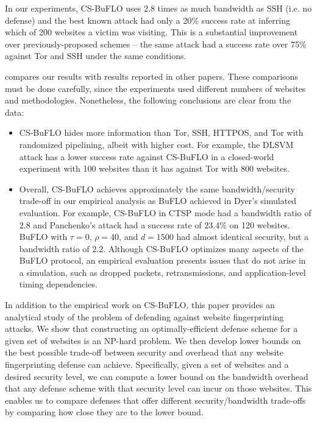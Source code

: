 \documentclass[10pt,journal]{IEEEtran}
\newcommand{\buflo} {BuFLO\xspace}
\newcommand{\csb} {CS-BuFLO\xspace}
\begin{document}
In our experiments, \csb uses 2.8 times as much bandwidth as SSH (i.e. no
defense) and the best known attack had only a 20\% success rate at
inferring which of 200 websites a victim was visiting.  This is a
substantial improvement over previously-proposed schemes -- the same
attack had a success rate over 75\% against Tor and SSH under the same
conditions.

 compares our results with results reported in
other papers.  These comparisons must be done carefully, since the
experiments used different numbers of websites and methodologies.
Nonetheless, the following conclusions are clear from the data:
\begin{itemize}
  \item \csb hides more information than Tor, SSH, HTTPOS, and Tor
    with randomized pipelining, albeit with higher cost. For example,
    the DLSVM attack has a lower success rate against \csb in a
    closed-world experiment with 100 websites than it has against Tor
    with 800 websites.
    
  \item Overall, \csb achieves approximately the same
    bandwidth/security trade-off in our empirical analysis as \buflo
    achieved in Dyer's simulated evaluation.  For example, \csb in
    CTSP mode had a bandwidth ratio of 2.8 and Panchenko's attack had
    a success rate of 23.4\% on 120 websites.  \buflo with $\tau=0$, 
    $\rho=40$, and $d=1500$ had almost identical security, but a
    bandwidth ratio of 2.2.  Although \csb optimizes many aspects of
    the \buflo protocol, an empirical evaluation presents issues that
    do not arise in a simulation, such as dropped packets,
    retransmissions, and application-level timing dependencies.
\end{itemize}

In addition to the empirical work on \csb, this paper provides an
analytical study of the problem of defending against website
fingerprinting attacks.  We show that constructing an
optimally-efficient defense scheme for a given set of websites is an
NP-hard problem.  We then develop lower bounds on the best possible
trade-off between security and overhead that any website
fingerprinting defense can achieve.  Specifically, given a set of
websites and a desired security level, we can compute a lower bound on
the bandwidth overhead that any defense scheme with that security
level can incur on those websites.  This enables us to compare
defenses that offer different security/bandwidth trade-offs by
comparing how close they are to the lower bound.
\end{document}
